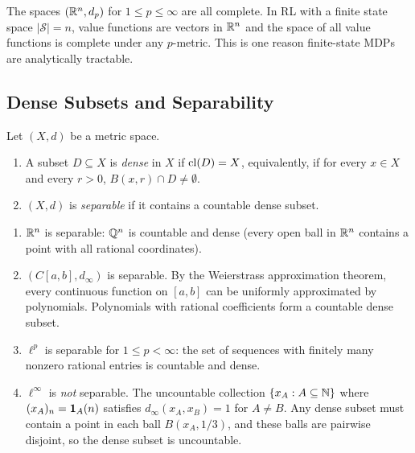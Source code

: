 \documentclass[11pt,a4paper]{article}
\begin{document}
\begin{keyresult}[title={Completeness of $\R^n$}]
The spaces $(\mathbb{R}^n, d_p)$ for $1 \le p \le \infty$ are all complete. In RL with
a finite state space $|\mathcal{S}| = n$, value functions are vectors in
$\R^n$ and the space of all value functions is complete under any $p$-metric.
This is one reason finite-state MDPs are analytically tractable.
\end{keyresult}

\subsection{Dense Subsets and Separability}
\label{subsec:separable}

\begin{definition}
\label{def:separable}
Let $(X,d)$ be a metric space.
\begin{enumerate}[nosep,label=(\roman*)]
  \item A subset $D \subseteq X$ is \emph{dense} in $X$ if $\operatorname{cl}(D) = X$,
    equivalently, if for every $x \in X$ and every $r > 0$,
    $B(x,r) \cap D \ne \emptyset$.
  \item $(X,d)$ is \emph{separable} if it contains a countable dense subset.
\end{enumerate}
\end{definition}

\begin{example}
\label{ex:separable}
\begin{enumerate}[nosep,label=(\alph*)]
  \item $\R^n$ is separable: $\mathbb{Q}^n$ is countable and dense (every open ball
    in $\R^n$ contains a point with all rational coordinates).
  \item $(C[a,b], d_\infty)$ is separable. By the Weierstrass approximation
    theorem, every continuous function on $[a,b]$ can be uniformly
    approximated by polynomials. Polynomials with rational coefficients form a
    countable dense subset.
  \item $\ell^p$ is separable for $1 \le p < \infty$: the set of sequences
    with finitely many nonzero rational entries is countable and dense.
  \item $\ell^\infty$ is \emph{not} separable. The uncountable collection
    $\{x_A : A \subseteq \mathbb{N}\}$ where $(x_A)_n = \mathbf{1}_A(n)$ satisfies
    $d_\infty(x_A, x_B) = 1$ for $A \ne B$. Any dense subset must contain a
    point in each ball $B(x_A, 1/3)$, and these balls are pairwise disjoint,
    so the dense subset is uncountable.
\end{enumerate}
\end{example}
\end{document}
